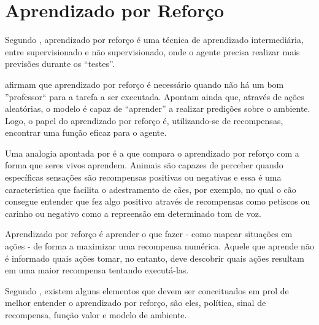 \section{Aprendizado por Reforço}\label{aprendizado}

Segundo , aprendizado por reforço é uma técnica de aprendizado
intermediária, entre supervisionado e não supervisionado, onde o agente precisa realizar mais
previsões durante os ``testes''.

 afirmam que aprendizado por reforço é necessário quando não há um
bom ''professor`` para a tarefa a ser executada. Apontam ainda que, através de ações aleatórias, o
modelo é capaz de ``aprender'' a realizar predições sobre o ambiente. Logo, o papel do aprendizado
por reforço é, utilizando-se de recompensas, encontrar uma função eficaz para o agente.

Uma analogia apontada por  é a que compara o aprendizado por
reforço com a forma que seres vivos aprendem. Animais são capazes de perceber
quando específicas
sensações são recompensas positivas ou negativas e essa é uma característica que facilita o
adestramento de cães, por exemplo, no qual o cão consegue entender que fez algo positivo através de
recompensas como petiscos ou carinho ou negativo como a repreensão em determinado tom de voz.

\begin{citacao}
    Aprendizado por reforço é aprender o que fazer - como mapear situações em ações - de forma a
    maximizar uma recompensa numérica. Aquele que aprende não é informado quais ações tomar, no
    entanto, deve descobrir quais ações resultam em uma maior recompensa tentando executá-las.
    \cite{sutton2018reinforcement}
\end{citacao}

Segundo , existem alguns elementos que devem ser conceituados em
prol de melhor entender o aprendizado por reforço, são eles, política, sinal de recompensa, função
valor e modelo de ambiente.

